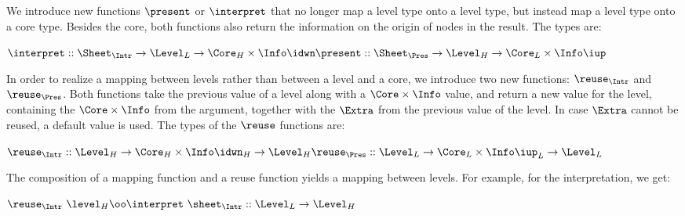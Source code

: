 We introduce new functions $\present$ or $\interpret$ that no longer map a level type onto a level type, but instead map a level type onto a core type. Besides the core, both functions also return the information on the origin of nodes in the result. The types are:

\begin{small}\begin{math}
\interpret :: \Sheet_{\Intr} \rightarrow \Level_{L} \rightarrow \Core_{H}\times \Info\idwn\\
\present :: \Sheet_{\Pres} \rightarrow  \Level_{H} \rightarrow \Core_{L}\times \Info\iup\\
\end{math}\end{small}

In order to realize a mapping between levels rather than between a level and a core, we introduce two new functions: $\reuse_{\Intr}$  and $\reuse_{\Pres}$. Both functions take the previous value of a level along with a $\Core \times \Info$ value, and return a new value for the level, containing the $\Core \times \Info$ from the argument, together with the $\Extra$ from the previous value of the level. In case $\Extra$  cannot be reused, a default value is used. The types of the $\reuse$ functions are:

\begin{small}\begin{math}
\reuse_{\Intr} ::  \Level_{H} \rightarrow \Core_{H} \times \Info\idwn_{H} \rightarrow \Level_{H}\\
\reuse_{\Pres} ::  \Level_{L}  \rightarrow \Core_{L} \times \Info\iup_{L}    \rightarrow \Level_{L}\\
\end{math}\end{small} 

The composition of a mapping function and a reuse function yields a mapping between levels. For example, for the interpretation, we get:

\begin{small}\begin{math}
\reuse_{\Intr}~\level_{H} \oo \interpret~\sheet_{\Intr} :: \Level_{L} \rightarrow \Level_{H}
\end{math}\end{small} 

